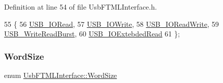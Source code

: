 Definition at line 54 of file Usb\+F\+T\+M\+L\+Interface.\+h.


\begin{DoxyCode}
55     \{
56       \hyperlink{classUsbFTMLInterface_a181227ebb27454964e5b6d185432498da71463bc1f4116a7456f7f298d030ecc7}{USB\_IORead},
57       \hyperlink{classUsbFTMLInterface_a181227ebb27454964e5b6d185432498daa9295e3a8e1c21709afd36f4405b346b}{USB\_IOWrite},
58       \hyperlink{classUsbFTMLInterface_a181227ebb27454964e5b6d185432498dae7dbd66b9634d787979e1b081defc297}{USB\_IOReadWrite},
59       \hyperlink{classUsbFTMLInterface_a181227ebb27454964e5b6d185432498da9c6732d74013c323f7d0346793ea105c}{USB\_WriteReadBurst},
60       \hyperlink{classUsbFTMLInterface_a181227ebb27454964e5b6d185432498dab677684fb0f754cbca04824b202d8ebe}{USB\_IOExtebdedRead}
61     \};
\end{DoxyCode}
\mbox{\label{classUsbFTMLInterface_ae0f25daa336091a5acd548aef3e9b4b4}} 
\subsubsection{\texorpdfstring{Word\+Size}{WordSize}}
{\footnotesize\ttfamily enum \hyperlink{classUsbFTMLInterface_ae0f25daa336091a5acd548aef3e9b4b4}{Usb\+F\+T\+M\+L\+Interface\+::\+Word\+Size}}


